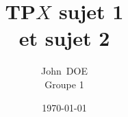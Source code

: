 


\newcommand{\firstName}{John}
\newcommand{\lastName}{DOE}
\newcommand{\groupNumber}{1}
\newcommand{\university}{My university}

\makeatletter
{}
\makeatother

\universityLogo



\usepackage{multicol}         %



\setcounter{tocdepth}{4}





  \titlehead{{\Large Matière} \hfill 2nde Année - 2023/2024}
  \title{TP$X$ sujet 1 \\ et sujet 2}
  \author{\firstName\ \lastName\\Groupe \groupNumber}
  \date{\today}
  \publishers{\university}

  \maketitle

  \noindent\makebox[\linewidth]{\rule{7.5cm}{0.4pt}}

  \tableofcontents
  \newpage




